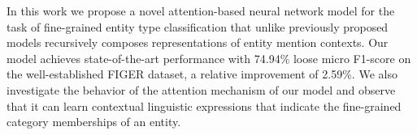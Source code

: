 In this work we propose a novel attention-based neural network model for the task of fine-grained entity type classification that unlike previously proposed models recursively composes representations of entity mention contexts. Our model achieves state-of-the-art performance with 74.94\% loose micro F1-score on the well-established FIGER dataset, a relative improvement of 2.59\%. We also investigate the behavior of the attention mechanism of our model and observe that it can learn contextual linguistic expressions that indicate the fine-grained category memberships of an entity.
